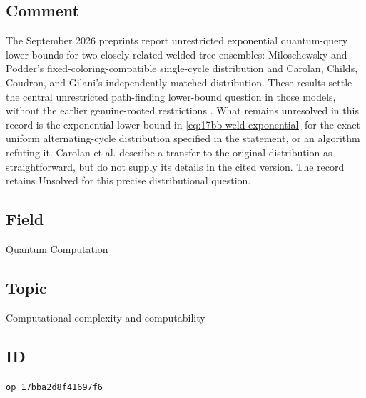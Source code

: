 \subsection*{Comment}

The September 2026 preprints report unrestricted exponential quantum-query lower bounds for two closely related welded-tree ensembles: Miloschewsky and Podder's fixed-coloring-compatible single-cycle distribution and Carolan, Childs, Coudron, and Gilani's independently matched distribution. These results settle the central unrestricted path-finding lower-bound question in those models, without the earlier genuine-rooted restrictions . What remains unresolved in this record is the exponential lower bound in \eqref{eq:17bb-weld-exponential} for the exact uniform alternating-cycle distribution specified in the statement, or an algorithm refuting it. Carolan et al. describe a transfer to the original distribution as straightforward, but do not supply its details in the cited version. The record retains Unsolved for this precise distributional question.

\subsection*{Field}

Quantum Computation

\subsection*{Topic}

Computational complexity and computability

\subsection*{ID}

\texttt{op\_17bba2d8f41697f6}
